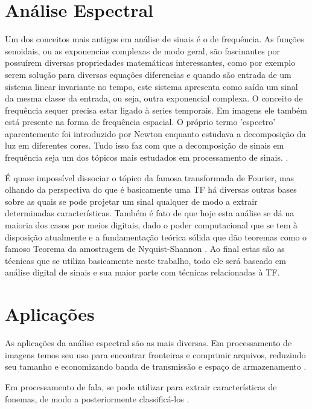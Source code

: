 
\section{Análise Espectral}

Um dos conceitos mais antigos em análise de sinais é o de frequência. As funções senoidais, ou as exponencias complexas de modo geral, são fascinantes por possuírem diversas propriedades matemáticas interessantes, como por exemplo serem solução para diversas equações diferencias e quando são entrada de um sistema linear invariante no tempo, este sistema apresenta como saída um sinal da mesma classe da entrada, ou seja, outra exponencial complexa. O conceito de frequência sequer precisa estar ligado à series temporais. Em imagens ele também está presente na forma de frequência espacial. O próprio termo 'espectro' aparentemente foi introduzido por Newton enquanto estudava a decomposição da luz em diferentes cores. Tudo isso faz com que a decomposição de sinais em frequência seja um dos tópicos mais estudados em processamento de sinais. \cite{stoica2005spectral} \cite{castanie2013digital}.

É quase impossível dissociar o tópico da famosa transformada de Fourier, mas olhando da perspectiva do que é basicamente uma TF há diversas outras bases sobre as quais se pode projetar um sinal qualquer de modo a extrair determinadas características. Também é fato de que hoje esta análise se dá na maioria dos casos por meios digitais, dado o poder computacional que se tem à disposição atualmente e a fundamentação teórica sólida que dão teoremas como o famoso Teorema da amostragem de Nyquist-Shannon \cite{mitra2006digital} \cite{lago2002digital}. Ao final estas são as técnicas que se utiliza basicamente neste trabalho, todo ele será baseado em análise digital de sinais e sua maior parte com técnicas relacionadas à TF.

\section{Aplicações}

As aplicações da análise espectral são as mais diversas. Em processamento de imagens temos seu uso para encontrar fronteiras e comprimir arquivos, reduzindo seu tamanho e economizando banda de transmissão e espaço de armazenamento \cite{baxes1994digital}. 

Em processamento de fala, se pode utilizar para extrair características de fonemas, de modo a posteriormente classificá-los \cite{huang2001spoken}.

